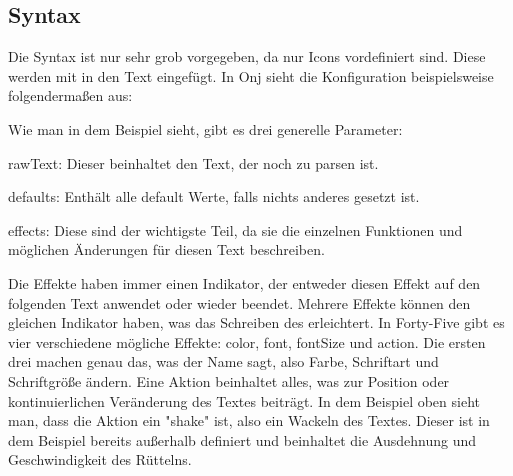 
\renewcommand{\kapitelautor}{Autor: Felix Zwickelstorfer}
\subsection{Syntax}\label{subsec:syntax}
\renewcommand{\kapitelautor}{Autor: Felix Zwickelstorfer}

Die Syntax ist nur sehr grob vorgegeben, da nur Icons vordefiniert sind.
Diese werden mit  in den Text eingefügt.
In Onj sieht die Konfiguration beispielsweise folgendermaßen aus:

Wie man in dem Beispiel sieht, gibt es drei generelle Parameter:
\begin{liste}
    \item rawText: Dieser beinhaltet den Text, der noch zu parsen ist.
    \item defaults: Enthält alle default Werte, falls nichts anderes gesetzt ist.
    \item effects: Diese sind der wichtigste Teil, da sie die einzelnen Funktionen und möglichen Änderungen für diesen Text beschreiben.
\end{liste}


Die Effekte haben immer einen Indikator, der entweder diesen Effekt auf den folgenden Text anwendet oder wieder beendet.
Mehrere Effekte können den gleichen Indikator haben, was das Schreiben des  erleichtert.
In Forty-Five gibt es vier verschiedene mögliche Effekte: color, font, fontSize und action.
Die ersten drei machen genau das, was der Name sagt, also Farbe, Schriftart und Schriftgröße ändern.
Eine Aktion beinhaltet alles, was zur Position oder kontinuierlichen Veränderung des Textes beiträgt.
In dem Beispiel oben sieht man, dass die Aktion ein "shake" ist, also ein Wackeln des Textes.
Dieser ist in dem Beispiel bereits außerhalb definiert und beinhaltet die Ausdehnung und Geschwindigkeit des Rüttelns.